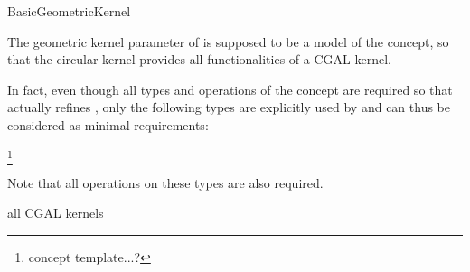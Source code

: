 \begin{ccRefConcept}{BasicGeometricKernel} 

\ccDefinition

The geometric kernel parameter of  is
supposed to be a model of the  concept, so that the
circular kernel provides all functionalities of a CGAL kernel.  

In fact, even though all types and operations of the
 concept are required so that
 actually refines , only
the following types are explicitly used by  and
can thus be considered as minimal requirements:

 \footnote{concept template...?}


Note that all operations on these types are also required.

\ccHasModels

all CGAL kernels

\ccSeeAlso


\end{ccRefConcept}
